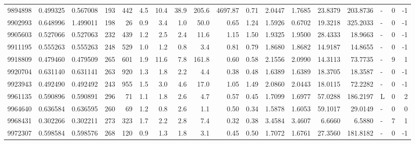 \begin{tabular}{rrrrrrrrrrrrrrrlrr}
   9894898 & 0.499325 &   0.567008 &  193 &  442 &      4.5 &     10.4 &    38.9 &    205.6 &    4697.87 &        0.71 &  2.0447 &  1.7685 &   23.8379 &  203.8736 &             - &        0 &         -1 \\
   9902993 & 0.648996 &   1.499011 &  198 &   26 &      0.9 &      3.4 &     1.0 &     50.0 &       0.65 &        1.24 &  1.5926 &  0.6702 &   19.3218 &  325.2033 &             - &        0 &         -1 \\
   9905603 & 0.527066 &   0.527063 &  232 &  439 &      1.2 &      2.5 &     2.4 &     11.6 &       1.15 &        1.50 &  1.9325 &  1.9500 &   28.4333 &   18.9663 &             - &        0 &         -1 \\
   9911195 & 0.555263 &   0.555263 &  248 &  529 &      1.0 &      1.2 &     0.8 &      3.4 &       0.81 &        0.79 &  1.8680 &  1.8682 &   14.9187 &   14.8655 &             - &        0 &         -1 \\
   9918809 & 0.479460 &   0.479509 &  265 &  601 &      1.9 &     11.6 &     7.8 &    161.8 &       0.60 &        0.58 &  2.1556 &  2.0990 &   14.3113 &   73.7735 &             - &        9 &          1 \\
   9920704 & 0.631140 &   0.631141 &  263 &  920 &      1.3 &      1.8 &     2.2 &      4.4 &       0.38 &        0.48 &  1.6389 &  1.6389 &   18.3705 &   18.3587 &             - &        0 &         -1 \\
   9923943 & 0.492490 &   0.492492 &  243 &  955 &      1.5 &      3.0 &     4.6 &     17.0 &       1.05 &        1.49 &  2.0860 &  2.0443 &   18.0115 &   72.2282 &             - &        0 &         -1 \\
   9961135 & 0.590896 &   0.590891 &  296 &   71 &      1.1 &      1.8 &     2.6 &      4.7 &       0.57 &        0.45 &  1.7099 &  1.6977 &   57.0288 &  186.2197 &             L &        0 &          2 \\
   9964640 & 0.636584 &   0.636595 &  260 &   69 &      1.2 &      0.8 &     2.6 &      1.1 &       0.50 &        0.34 &  1.5878 &  1.6053 &   59.1017 &   29.0149 &             - &        0 &          0 \\
   9968431 & 0.302266 &   0.302211 &  273 &  323 &      1.7 &      2.2 &     2.8 &      7.4 &       0.32 &        0.38 &  3.4584 &  3.4607 &    6.6660 &    6.5880 &             - &        7 &          1 \\
   9972307 & 0.598584 &   0.598576 &  268 &  120 &      0.9 &      1.3 &     1.8 &      3.1 &       0.45 &        0.50 &  1.7072 &  1.6761 &   27.3560 &  181.8182 &             - &        0 &         -1 \\

\end{tabular}
